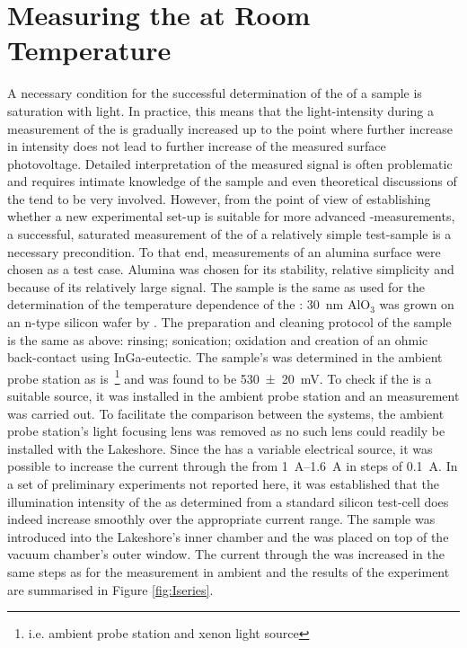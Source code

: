 \section{Measuring the \spv{} at Room Temperature}
A necessary condition for the successful determination of the \spv{} of a sample is saturation with light. In practice, this means that the light-intensity during a measurement of the \spv{} is gradually increased up to the point where further increase in intensity does not lead to further increase of the measured surface photovoltage. Detailed interpretation of the measured signal is often problematic and requires intimate knowledge of the sample and even theoretical discussions of the \spv{} tend to be very involved. However, from the point of view of establishing whether a new experimental set-up is suitable for more advanced \spv{}-measurements, a successful, saturated measurement of the \spv{} of a relatively simple test-sample is a necessary precondition. To that end, \spv{} measurements of an alumina surface were chosen as a test case. Alumina was chosen for its stability, relative simplicity and because of its relatively large \spv{} signal. The sample is the same as used for the determination of the temperature dependence of the \cpd{}: \SI{30}{\nano\metre} AlO$_3$ was grown on an n-type silicon wafer by \peald{}. The preparation and cleaning protocol of the sample is the same as above: rinsing; sonication; oxidation and creation of an ohmic back-contact using InGa-eutectic. The sample's \spv{} was determined in the ambient probe station as is~\footnote{i.e. ambient probe station and xenon light source} and was found to be \SI{530+-20}{\milli\volt}. To check if the \led{} is a suitable source, it was installed in the ambient probe station and an \spv{} measurement was carried out. To facilitate the comparison between the systems, the ambient probe station's light focusing lens was removed as no such lens could readily be installed with the Lakeshore. Since the \led{} has a variable electrical source, it was possible to increase the current through the \led{} from \SIrange{1}{1.6}{\ampere} in steps of \SI{0.1}{\ampere}. In a set of preliminary experiments not reported here, it was established that the illumination intensity of the \led{} as determined from a standard silicon test-cell does indeed increase smoothly over the appropriate current range. The sample was introduced into the Lakeshore's inner chamber and the \led{} was placed on top of the vacuum chamber's outer window. The current through the \led{} was increased in the same steps as for the measurement in ambient and the results of the experiment are summarised in Figure \ref{fig:Iseries}.
